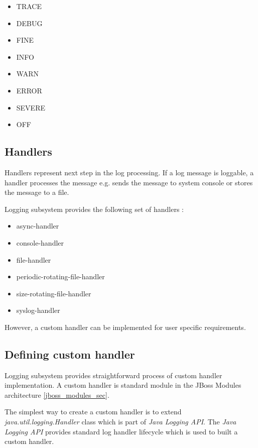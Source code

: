 \documentclass[12pt,oneside]{fithesis2}
\begin{document}
\begin{multicols}{2}
	\begin{itemize}
		\item TRACE
		\item DEBUG
		\item FINE
		\item INFO
		\item WARN
		\item ERROR
		\item SEVERE
		\item OFF
	\end{itemize}
\end{multicols}
\subsection{Handlers}
\label{handlers}
Handlers represent next step in the log processing. If a log message is loggable, a handler processes the message e.g. sends the message to system console or stores the message to a file.

Logging subsystem provides the following set of handlers \cite{wildfly_doc}:
\begin{itemize}
	\item async-handler
	\item console-handler
	\item file-handler
	\item periodic-rotating-file-handler
	\item size-rotating-file-handler
	\item syslog-handler
\end{itemize}
\noindent
However, a custom handler can be implemented for user specific requirements.

\subsection{Defining custom handler}
\label{custom_handler}
Logging subsystem provides straightforward process of custom handler implementation. A custom handler is standard module in the JBoss Modules architecture \ref{jboss_modules_sec}.

The simplest way to create a custom handler is to extend \textit{java.util.logging.Handler} class which is part of \textit{Java Logging API}. The \textit{Java Logging API} provides standard log handler lifecycle which is used to built a custom handler.
\end{document}
